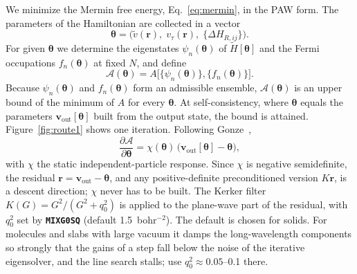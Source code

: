 \documentclass[11pt,a4paper,oneside]{book}
\newcommand{\vth}{\bm\theta}
\newcommand{\vout}{\bm v_{\mathrm{out}}}
\newcommand{\key}[1]{\textbf{\texttt{#1}}}
\begin{document}
We minimize the Mermin free energy, Eq.~\eqref{eq:mermin}, in the PAW
form. The parameters of the Hamiltonian are collected in a vector
\begin{equation}
  \vth = \bigl(\tilde v(\bm r),\; v_\tau(\bm r),\; \{\Delta H_{R,ij}\}\bigr).
\end{equation}
For given $\vth$ we determine the eigenstates $\psi_n(\vth)$ of
$\tilde H[\vth]$ and the Fermi occupations $f_n(\vth)$ at fixed $N$, and
define
\begin{equation}
  \mathcal{A}(\vth) = A\bigl[\{\psi_n(\vth)\},\{f_n(\vth)\}\bigr].
\end{equation}
Because $\psi_n(\vth)$ and $f_n(\vth)$ form an admissible ensemble,
$\mathcal{A}(\vth)$ is an upper bound of the minimum of $A$ for every
$\vth$. At self-consistency, where $\vth$ equals the parameters
$\vout[\vth]$ built from the output state, the bound is attained.
Figure~\ref{fig:route1} shows one iteration.
Following Gonze~\cite{Gonze1996},
\begin{equation}
  \frac{\partial \mathcal{A}}{\partial \vth}
  = \chi(\vth)\,\bigl(\vout[\vth]-\vth\bigr),
\end{equation}
with $\chi$ the static independent-particle response. Since $\chi$ is
negative semidefinite, the residual $\bm r=\vout-\vth$, and any
positive-definite preconditioned version $K\bm r$, is a descent
direction; $\chi$ never has to be built. The Kerker filter
$K(G)=G^2/(G^2+q_0^2)$ is applied to the plane-wave part of the residual,
with $q_0^2$ set by \key{MIXG0SQ} (default 1.5~bohr$^{-2}$). The default is
chosen for solids. For molecules and slabs with large vacuum it damps the
long-wavelength components so strongly that the gains of a step fall
below the noise of the iterative eigensolver, and the line search
stalls; use $q_0^2\approx0.05$--0.1 there.
\end{document}
